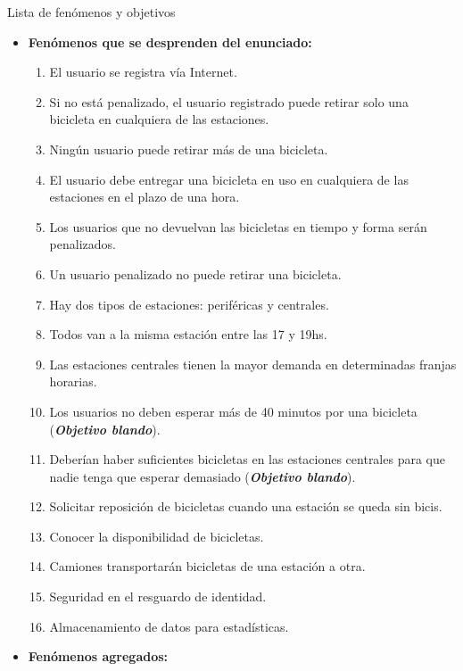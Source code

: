 \begin{subsection}{Lista de fenómenos y objetivos}

\begin{itemize}
\item \textbf{Fenómenos que se desprenden del enunciado:}

\begin{enumerate}
\item El usuario se registra vía Internet.
\item Si no está penalizado, el usuario registrado puede retirar solo una bicicleta en cualquiera de las estaciones.
\item Ningún usuario puede retirar más de una bicicleta.
\item El usuario debe entregar una bicicleta en uso en cualquiera de las estaciones en el plazo de una hora.
\item Los usuarios que no devuelvan las bicicletas en tiempo y forma serán penalizados.
\item Un usuario penalizado no puede retirar una bicicleta.
\item Hay dos tipos de estaciones: periféricas y centrales.
\item Todos van a la misma estación entre las 17 y 19hs.
\item Las estaciones centrales tienen la mayor demanda en determinadas franjas horarias.
\item Los usuarios no deben esperar más de 40 minutos por una bicicleta (\textbf{\emph{Objetivo blando}}).
\item Deberían haber suficientes bicicletas en las estaciones centrales para que nadie tenga que esperar demasiado (\textbf{\emph{Objetivo blando}}).
\item Solicitar reposición de bicicletas cuando una estación se queda sin bicis.
\item Conocer la disponibilidad de bicicletas.
\item Camiones transportarán bicicletas de una estación a otra.
\item Seguridad en el resguardo de identidad.
\item Almacenamiento de datos para estadísticas.
\end{enumerate}

\item \textbf{Fenómenos agregados:}


\end{itemize}
\end{subsection}
